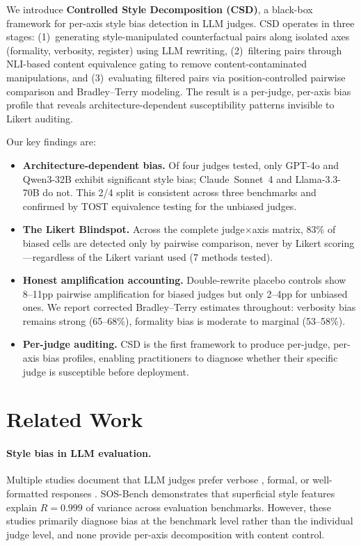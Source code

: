 \documentclass[11pt]{article}
\begin{document}
We introduce \textbf{Controlled Style Decomposition (CSD)}, a black-box framework for per-axis style bias detection in LLM judges. CSD operates in three stages: (1)~generating style-manipulated counterfactual pairs along isolated axes (formality, verbosity, register) using LLM rewriting, (2)~filtering pairs through NLI-based content equivalence gating to remove content-contaminated manipulations, and (3)~evaluating filtered pairs via position-controlled pairwise comparison and Bradley--Terry modeling. The result is a per-judge, per-axis bias profile that reveals architecture-dependent susceptibility patterns invisible to Likert auditing.

Our key findings are:

\begin{itemize}
\item \textbf{Architecture-dependent bias.} Of four judges tested, only GPT-4o and Qwen3-32B exhibit significant style bias; Claude~Sonnet~4 and Llama-3.3-70B do not. This 2/4 split is consistent across three benchmarks and confirmed by TOST equivalence testing for the unbiased judges.

\item \textbf{The Likert Blindspot.} Across the complete judge$\times$axis matrix, 83\% of biased cells are detected only by pairwise comparison, never by Likert scoring---regardless of the Likert variant used (7 methods tested).

\item \textbf{Honest amplification accounting.} Double-rewrite placebo controls show 8--11pp pairwise amplification for biased judges but only 2--4pp for unbiased ones. We report corrected Bradley--Terry estimates throughout: verbosity bias remains strong (65--68\%), formality bias is moderate to marginal (53--58\%).

\item \textbf{Per-judge auditing.} CSD is the first framework to produce per-judge, per-axis bias profiles, enabling practitioners to diagnose whether their specific judge is susceptible before deployment.
\end{itemize}

\section{Related Work}

\paragraph{Style bias in LLM evaluation.} Multiple studies document that LLM judges prefer verbose \cite{saito2023verbosity,wu2024style}, formal, or well-formatted responses \cite{park2024offsetbias,stureborg2024large}. SOS-Bench \cite{ye2024sosbench} demonstrates that superficial style features explain $R=0.999$ of variance across evaluation benchmarks. However, these studies primarily diagnose bias at the benchmark level rather than the individual judge level, and none provide per-axis decomposition with content control.
\end{document}

